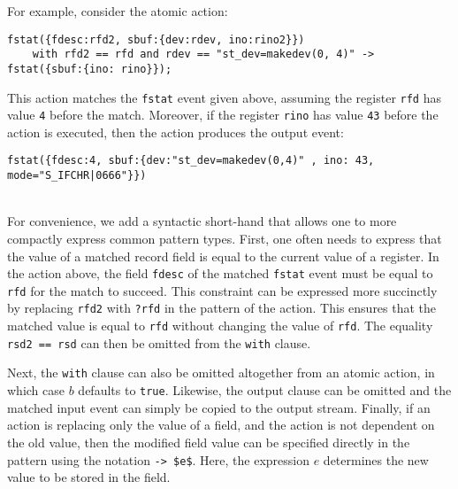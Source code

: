 For example, consider the atomic action:
\\[.3em]
\begin{adjustbox}{max width=\textwidth}
\begin{lstlisting}[numbers=none,xleftmargin=0em,gobble=2]
  fstat({fdesc:rfd2, sbuf:{dev:rdev, ino:rino2}})
    with rfd2 == rfd and rdev == "st_dev=makedev(0, 4)" -> fstat({sbuf:{ino: rino}});
\end{lstlisting}
This action matches the \lstinline+fstat+ event given above, assuming the register \lstinline+rfd+ has value \lstinline+4+ before the match. Moreover, if the register \lstinline+rino+ has value \lstinline+43+ before the action is executed, then the action produces the output event:
\\[.3em]
\begin{adjustbox}{max width=\textwidth}
\begin{lstlisting}[numbers=none,xleftmargin=0em,gobble=2]
  fstat({fdesc:4, sbuf:{dev:"st_dev=makedev(0,4)" , ino: 43, mode="S_IFCHR|0666"}})
  \end{lstlisting}
\end{adjustbox}\\[.5em]
For convenience, we add a syntactic short-hand that allows one to more compactly express common pattern types. First, one often needs to express that the value of a matched record field is equal to the current value of a register. In the action above, the field \lstinline+fdesc+ of the matched \lstinline+fstat+ event must be equal to \lstinline+rfd+ for the match to succeed. This constraint can be expressed more succinctly by replacing \lstinline+rfd2+ with \lstinline+?rfd+ in the pattern of the action. This ensures that the matched value is equal to \lstinline+rfd+ without changing the value of \lstinline+rfd+. The equality \lstinline+rsd2 == rsd+ can then be omitted from the \lstinline+with+ clause.

Next, the \lstinline+with+ clause can also be omitted altogether from an atomic action, in which case $b$ defaults to \lstinline+true+. Likewise, the output clause can be omitted and the matched input event can simply be copied to the output stream. Finally, if an action is replacing only the value of a field, and the action is not dependent on the old value, then the modified field value can be specified directly in the pattern using the notation \lstinline+-> $e$+. Here, the expression $e$ determines the new value to be stored in the field.


\end{adjustbox}
